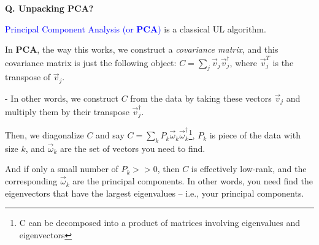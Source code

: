 \begin{frame}[fragile]{\textbf{Q. Unpacking PCA?}}
  \begin{wideitemize}
    \item \textcolor{blue}{Principal Component Analysis (or \textbf{PCA})} is a classical UL algorithm.
    \item In \textbf{PCA}, the way this works, we construct a \textit{covariance matrix},
    and this covariance matrix is just the following object: $C = \sum_{j} \vec{v}_j\vec{v}^{\dagger}_{j}$,
    where $\vec{v}^{T}_{j}$ is the transpose of $\vec{v}_{j}$.
    \begin{wideitemize}
      \item[-] In other words, we construct $C$ from the data by taking these vectors $\vec{v}_j$ and
      multiply them by their transpose $\vec{v}^{\dagger}_j$.
    \end{wideitemize}
    \item Then, we diagonalize $C$ and say $C = \sum_{k} P_k
	  \vec{\omega}_{k}\vec{\omega}^{\dagger}_{k}$\footnote{C can be decomposed into a product
    of matrices involving eigenvalues and eigenvectors}, $P_k$ is piece of the data with size $k$,
    and $\vec{\omega}_{k}$ are the set of vectors you need to find.
    \item And if only a small number of $P_k >> 0$, then $C$ is effectively low-rank,
    and the corresponding $\vec{\omega}_{k}$ are the principal components. In other words,
    you need find the eigenvectors that have the largest eigenvalues -- i.e., your principal components.
  \end{wideitemize}

\end{frame}


